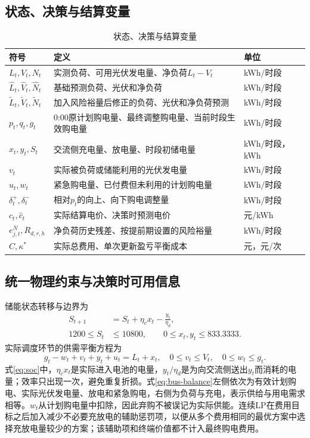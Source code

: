 \documentclass[UTF8,12pt,a4paper]{ctexart}
\theoremstyle{remark}
\begin{document}
\subsection{状态、决策与结算变量}
\begin{table}[htbp]\centering\small\caption{状态、决策与结算变量}\label{tab:variables}
\begin{tabular}{p{}p{}p{}}\toprule 符号&定义&单位\\\midrule
$L_t,V_t,N_t$&实测负荷、可用光伏发电量、净负荷$L_t-V_t$&kWh/时段\\
$\widehat L_t,\widehat V_t,\widehat N_t$&基础预测负荷、光伏和净负荷&kWh/时段\\
$\widetilde L_t,\widetilde V_t,\widetilde N_t$&加入风险裕量后修正的负荷、光伏和净负荷预测&kWh/时段\\
$p_t,q_t,g_t$&0:00原计划购电量、最终调整购电量、当前时段生效购电量&kWh/时段\\
$x_t,y_t,S_t$&交流侧充电量、放电量、时段初储电量&kWh/时段，kWh\\
$v_t$&实际被负荷或储能利用的光伏发电量&kWh/时段\\
$u_t,w_t$&紧急购电量、已付费但未利用的计划购电量&kWh/时段\\
$\delta_t^+,\delta_t^-$&相对$p_t$的向上、向下购电调整量&kWh/时段\\
$c_t,\widehat c_t$&实际结算电价、决策时预测电价&元/kWh\\
$e^N_{j,t},R_{d,r,h}$&净负荷历史残差、按提前期设置的风险裕量&kWh/时段\\
$C,\kappa^*$&实际总费用、单次更新盈亏平衡成本&元，元/次\\\bottomrule
\end{tabular}\end{table}

\subsection{统一物理约束与决策时可用信息}
储能状态转移与边界为
\begin{align}
S_{t+1}&=S_t+\eta_cx_t-\frac{y_t}{\eta_d},\label{eq:soc}\\
1200\le S_t&\le10800,\qquad0\le x_t,y_t\le833.3333.\label{eq:battery-bound}
\end{align}
实际调度环节的供需平衡方程为
\begin{equation}g_t-w_t+v_t+y_t+u_t=L_t+x_t,\quad0\le v_t\le V_t,\quad0\le w_t\le g_t.\label{eq:bus-balance}\end{equation}
式\eqref{eq:soc}中，$\eta_cx_t$是实际进入电池的电量，$y_t/\eta_d$是为向交流侧送出$y_t$而消耗的电量；效率只出现一次，避免重复折损。式\eqref{eq:bus-balance}左侧依次为有效计划购电、实际光伏发电量、放电和紧急购电，右侧为负荷与充电，表示供给与用电需求相等。$w_t$从计划购电量中扣除，因此弃购不被误记为实际供能。连续LP在费用目标之后加入减少不必要充放电的辅助惩罚项，以便从多个费用相同的最优方案中选择充放电量较少的方案；该辅助项和终端价值都不计入最终购电费用。
\end{document}
